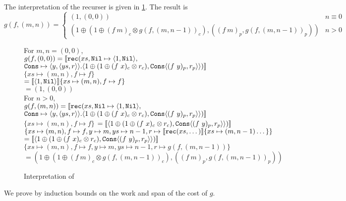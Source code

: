 The interpretation of the recurser is given in \ref{fig:ws_map_interpretation}.
The result is 
\begin{equation*}
  g(f, (m, n)) = \begin{cases}
    (1, (0, 0)) &n \equiv 0 \\
    (1 \oplus (1 \oplus (f\ m)_c \otimes g(f, (m, n-1))_c), ((f\ m)_p, g(f, (m, n-1))_p)) &n > 0
  \end{cases}
\end{equation*}

\begin{figure}
  \label{fig:ws_map_interpretation}
  \caption{Interpretation of }
  For $m, n = (0, 0)$, \\
  $g(f, (0, 0)) = \llbracket \texttt{rec}(xs, \texttt{Nil} \mapsto \langle 1, \texttt{Nil}\rangle,$\\
    $\texttt{Cons} \mapsto \langle y, \langle ys, r \rangle \rangle . \langle 1 \oplus (1 \oplus (f\ x)_c \otimes r_c), \texttt{Cons}\langle (f\ y)_p, r_p\rangle\rangle) \rrbracket$\\
    $\{ xs \mapsto (m, n), f \mapsto f\}$\\
    $= \llbracket \langle 1, \texttt{Nil} \rangle \rrbracket \{ xs \mapsto (m, n), f \mapsto f \}$\\
    $= (1, (0, 0))$\\
  For $n > 0$, \\
  $g(f, (m, n)) = \llbracket \texttt{rec}(xs, \texttt{Nil} \mapsto \langle 1, \texttt{Nil}\rangle,$\\
      $\texttt{Cons} \mapsto \langle y, \langle ys, r \rangle \rangle . \langle 1 \oplus (1 \oplus (f\ x)_c \otimes r_c), \texttt{Cons}\langle (f\ y)_p, r_p\rangle\rangle) \rrbracket$\\
      $\{xs \mapsto (m, n), f \mapsto f\}$
  $= \llbracket \langle 1 \oplus (1 \oplus (f\ x)_c \otimes r_c), \T{Cons}\langle (f\ y)_p, r_p\rangle\rangle) \rrbracket$\\
  $\{xs \mapsto (m, n), f \mapsto f, y \mapsto m, ys \mapsto n-1, r \mapsto \llbracket \texttt{rec}(xs, \dots ) \rrbracket \{xs \mapsto (m, n-1) \dots \} \}$
  $= \llbracket \langle 1 \oplus (1 \oplus (f\ x)_c \otimes r_c), \T{Cons}\langle (f\ y)_p, r_p\rangle\rangle) \rrbracket$\\
  $\{xs \mapsto (m, n), f \mapsto f, y \mapsto m, ys \mapsto n-1, r \mapsto g(f, (m, n-1))  \}$
  $= (1 \oplus (1 \oplus (f\ m)_c \otimes g(f, (m, n-1))_c), ((f\ m)_p, g(f, (m, n-1))_p))$
\end{figure}

We prove by induction bounds on the work and span of the cost of $g$.

